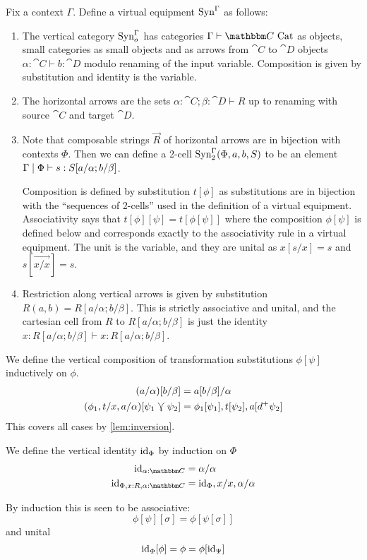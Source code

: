 \documentclass{llncs}
\begin{document}
\begin{definition}
  Fix a context $\Gamma$. Define a virtual equipment $\textrm{Syn}^\Gamma$ as
  follows:
  \begin{enumerate}
  \item The vertical category $\textrm{Syn}^\Gamma_o$ has categories $\Gamma
    \vdash \cat C \isaCat$ as objects, small categories as small
    objects and as arrows from $\cat C$ to $\cat D$ objects
    $\alpha:\cat C \vdash b : \cat D$ modulo renaming of the input
    variable. Composition is given by substitution and identity is the
    variable.
  \item The horizontal arrows are the sets $\alpha:\cat C; \beta:\cat
    D \vdash R$ up to renaming with source $\cat C$ and target $\cat
    D$.
  \item Note that composable strings $\vec R$ of horizontal arrows are
    in bijection with contexts $\Phi$. Then we can define a 2-cell
    $\textrm{Syn}^\Gamma_2(\Phi, a, b, S)$ to be an element
    $\Gamma\mathrel{|}\Phi\vdash s : S[a/\alpha;b/\beta]$.

    Composition is defined by substitution $t[\phi]$ as substitutions
    are in bijection with the ``sequences of 2-cells'' used in the
    definition of a virtual equipment. Associativity says that
    $t[\phi][\psi] = t[\phi[\psi]]$ where the composition $\phi[\psi]$
    is defined below and corresponds exactly to the associativity rule
    in a virtual equipment. The unit is the variable, and they are
    unital as $x[s/x] = s$ and $s[\vec {x/x}] = s$.
    
  \item Restriction along vertical arrows is given by substitution
    $R(a,b) = R[a/\alpha;b/\beta]$. This is strictly associative and
    unital, and the cartesian cell from $R$ to $R[a/\alpha;b/\beta]$
    is just the identity $x:R[a/\alpha;b/\beta] \vdash x :
    R[a/\alpha;b/\beta]$.
  \end{enumerate}
\end{definition}

\begin{definition}
  \label{lem:vertical-sq-cat}
  We define the vertical composition of transformation substitutions
  $\phi[\psi]$ inductively on $\phi$.
  \begin{align*}
    (a/\alpha)[b/\beta] &= a[b/\beta]/\alpha\\
    (\phi_1,t/x,a/\alpha)[\psi_1\curlyveedownarrow\psi_2] &= \phi_1[\psi_1], t[\psi_2],a[d^+\psi_2]
  \end{align*}
  This covers all cases by \cref{lem:inversion}.

  We define the vertical identity $\textrm{id}_\Phi$ by induction on $\Phi$
  \begin{align*}
    \id_{\alpha:\cat C} &= \alpha/\alpha\\
    \id_{\Phi,x:R,\alpha:\cat C} &= \id_{\Phi},x/x,\alpha/\alpha
  \end{align*}

  By induction this is seen to be associative:
  \[ \phi[\psi][\sigma] = \phi[\psi[\sigma]] \]
  and unital
  \[ \textrm{id}_{\Phi}[\phi] = \phi = \phi[\textrm{id}_{\Psi}] \]
\end{definition}
\end{document}
